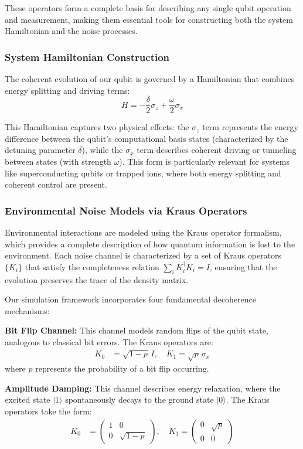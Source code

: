 \documentclass[%
 reprint,
 amsmath,amssymb,
 aps,
]{revtex4-2}
\begin{document}
These operators form a complete basis for describing any single qubit operation and measurement, making them essential tools for constructing both the system Hamiltonian and the noise processes.

\subsubsection{System Hamiltonian Construction}

The coherent evolution of our qubit is governed by a Hamiltonian that combines energy splitting and driving terms:
\begin{equation}
H = -\frac{\delta}{2}\sigma_z + \frac{\omega}{2}\sigma_x
\end{equation}

This Hamiltonian captures two physical effects: the $\sigma_z$ term represents the energy difference between the qubit's computational basis states (characterized by the detuning parameter $\delta$), while the $\sigma_x$ term describes coherent driving or tunneling between states (with strength $\omega$). This form is particularly relevant for systems like superconducting qubits or trapped ions, where both energy splitting and coherent control are present.

\subsubsection{Environmental Noise Models via Kraus Operators}

Environmental interactions are modeled using the Kraus operator formalism, which provides a complete description of how quantum information is lost to the environment. Each noise channel is characterized by a set of Kraus operators $\{K_i\}$ that satisfy the completeness relation $\sum_i K_i^\dagger K_i = I$, ensuring that the evolution preserves the trace of the density matrix.

Our simulation framework incorporates four fundamental decoherence mechanisms:

\textbf{Bit Flip Channel:} This channel models random flips of the qubit state, analogous to classical bit errors. The Kraus operators are:
\begin{align}
K_0 &= \sqrt{1-p}\,I, \quad K_1 = \sqrt{p}\,\sigma_x
\end{align}
where $p$ represents the probability of a bit flip occurring.

\textbf{Amplitude Damping:} This channel describes energy relaxation, where the excited state $|1\rangle$ spontaneously decays to the ground state $|0\rangle$. The Kraus operators take the form:
\begin{align}
K_0 &= \begin{pmatrix} 1 & 0 \\ 0 & \sqrt{1-p} \end{pmatrix}, \quad
K_1 = \begin{pmatrix} 0 & \sqrt{p} \\ 0 & 0 \end{pmatrix}
\end{align}
\end{document}
